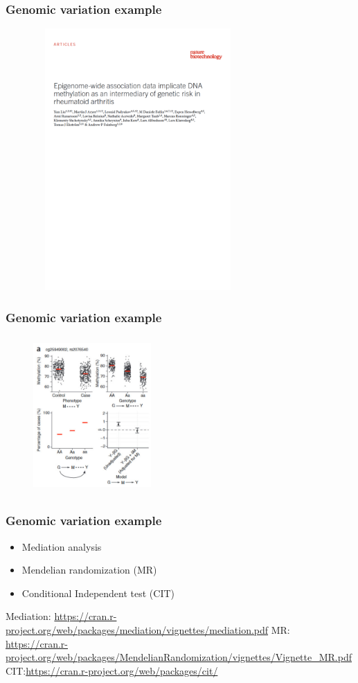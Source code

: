 \documentclass[10pt,xcolor=dvipsnames]{beamer}\usepackage[]{graphicx}\usepackage[]{color}
\begin{document}
\begin{frame}\frametitle{Genomic variation example}

\begin{figure}
  \includegraphics[height=10cm, width=8cm]{figures/multi_staged_example_1.pdf}
\end{figure}

\end{frame}


\begin{frame}\frametitle{Genomic variation example}

\begin{figure}
  \includegraphics[height=6cm, width=4.5cm]{figures/multi_staged_example_3.jpg}
\end{figure}

\end{frame}


\begin{frame}\frametitle{Genomic variation example}

\begin{itemize}
 \item Mediation analysis
 \item Mendelian randomization (MR)
 \item Conditional Independent test (CIT) 
\end{itemize}

Mediation: \url{https://cran.r-project.org/web/packages/mediation/vignettes/mediation.pdf}
MR: \url{https://cran.r-project.org/web/packages/MendelianRandomization/vignettes/Vignette_MR.pdf}
CIT:\url{https://cran.r-project.org/web/packages/cit/}

\end{frame}
\end{document}
